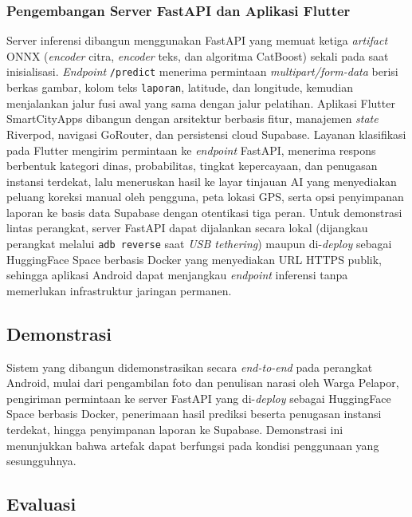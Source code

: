 \subsubsection{Pengembangan Server FastAPI dan Aplikasi Flutter}

Server inferensi dibangun menggunakan FastAPI yang memuat ketiga \textit{artifact} ONNX (\textit{encoder} citra, \textit{encoder} teks, dan algoritma CatBoost) sekali pada saat inisialisasi. \textit{Endpoint} \texttt{/predict} menerima permintaan \textit{multipart/form-data} berisi berkas gambar, kolom teks \texttt{laporan}, latitude, dan longitude, kemudian menjalankan jalur fusi awal yang sama dengan jalur pelatihan. Aplikasi Flutter SmartCityApps dibangun dengan arsitektur berbasis fitur, manajemen \textit{state} Riverpod, navigasi GoRouter, dan persistensi cloud Supabase. Layanan klasifikasi pada Flutter mengirim permintaan ke \textit{endpoint} FastAPI, menerima respons berbentuk kategori dinas, probabilitas, tingkat kepercayaan, dan penugasan instansi terdekat, lalu meneruskan hasil ke layar tinjauan AI yang menyediakan peluang koreksi manual oleh pengguna, peta lokasi GPS, serta opsi penyimpanan laporan ke basis data Supabase dengan otentikasi tiga peran. Untuk demonstrasi lintas perangkat, server FastAPI dapat dijalankan secara lokal (dijangkau perangkat melalui \texttt{adb reverse} saat \textit{USB tethering}) maupun di-\textit{deploy} sebagai HuggingFace Space berbasis Docker yang menyediakan URL HTTPS publik, sehingga aplikasi Android dapat menjangkau \textit{endpoint} inferensi tanpa memerlukan infrastruktur jaringan permanen.

\subsection{Demonstrasi}

Sistem yang dibangun didemonstrasikan secara \textit{end-to-end} pada perangkat Android, mulai dari pengambilan foto dan penulisan narasi oleh Warga Pelapor, pengiriman permintaan ke server FastAPI yang di-\textit{deploy} sebagai HuggingFace Space berbasis Docker, penerimaan hasil prediksi beserta penugasan instansi terdekat, hingga penyimpanan laporan ke Supabase. Demonstrasi ini menunjukkan bahwa artefak dapat berfungsi pada kondisi penggunaan yang sesungguhnya.

\subsection{Evaluasi}

